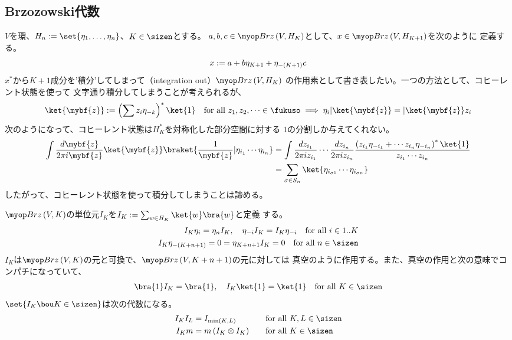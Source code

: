 {\subsection{Brzozowski代数}\label{s2:Brzozowski代数} %
	$V$を環、$H_n:=\set{\eta_1,\dots,\eta_n}$、$K\in\sizen$とする。
	$a,b,c\in\Brz\lr{V,H_K}$として、$x\in\Brz\lr{V,H_{K+1}}$を次のように
	定義する。
	\begin{equation*}\begin{split}
		x := a + b\eta_{K+1} + \eta_{-\left({K+1}\right)}c
	\end{split}\end{equation*}
	$x^*$から$K+1$成分を'積分'してしまって（integration out）$\Brz\lr{V,H_K}$
	の作用素として書き表したい。一つの方法として、コヒーレント状態を使って
	文字通り積分してしまうことが考えられるが、
	\begin{equation*}\begin{split}
		\ket{\mybf{z}} := \lr{\sum z_i\eta_{-k}}^*\ket{1}
		\quad\text{for all } z_1,z_2,\dots\in\fukuso
		\implies \eta_i|\ket{\mybf{z}} = |\ket{\mybf{z}}z_i
	\end{split}\end{equation*}
	次のようになって、コヒーレント状態は$H_K^*$を対称化した部分空間に対する
	$1$の分割しか与えてくれない。
	\begin{equation*}\begin{split}
		\int\frac{d\mybf{z}}{2\pi i\mybf{z}}
		\ket{\mybf{z}}\braket{\frac{1}{\mybf{z}}|\eta_{i_1}\cdots\eta_{i_n}}
		&= \int
		\frac{dz_{i_1}}{2\pi iz_{i_1}} \cdots \frac{dz_{i_n}}{2\pi iz_{i_n}}
		\frac{\lr{z_{i_1}\eta_{-i_1}+\cdots z_{i_n}\eta_{-i_n}}^*\ket{1}}
		{z_{i_1}\cdots z_{i_n}} \\
		&= \sum_{\sigma\in S_n}\ket{\eta_{i_{\sigma1}}\cdots\eta_{i_{\sigma n}}}
	\end{split}\end{equation*}
	したがって、コヒーレント状態を使って積分してしまうことは諦める。

	$\Brz\lr{V,K}$の単位元$I_K$を$I_K:=\sum_{w\in H_K}\ket{w}\bra{w}$と定義
	する。
	\begin{equation*}\begin{split}
		I_K\eta_i = \eta_nI_K ,\quad \eta_{-i}I_K = I_K\eta_{-i}
		\quad\text{for all } i\in1..K \\
		I_K\eta_{-\lr{K+n+1}} = 0 = \eta_{K+n+1}I_K = 0 
		\quad\text{for all } n\in\sizen
	\end{split}\end{equation*}
	$I_K$は$\Brz\lr{V,K}$の元と可換で、$\Brz\lr{V,K+n+1}$の元に対しては
	真空のように作用する。また、真空の作用と次の意味でコンパチになっていて、
	\begin{equation*}\begin{split}
		\bra{1}I_K = \bra{1},\quad I_K\ket{1} = \ket{1}
		\quad\text{for all } K\in\sizen
	\end{split}\end{equation*}
	$\set{I_K\bou K\in\sizen}$は次の代数になる。
	\begin{alignat*}{2}
		I_KI_L &= I_{\min\lr{K,L}} &\quad&\text{for all } K,L\in\sizen \\
		I_Km &= m\lr{I_K\otimes I_K} &\quad&\text{for all } K\in\sizen
	\end{alignat*}

}
